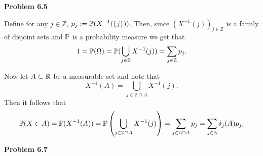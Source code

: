 \bigskip

\textbf{Problem 6.5}

Define for any $j \in \mathbb{Z}$, $p_j := \mathbb P(X^{-1}(\{j\}))$. Then, since $(X^{-1}(j))_{j \in \mathbb{Z}}$ is a family of disjoint sets and $\mathbb P$ is a probability measure we get that
\[
	1 = \mathbb P(\Omega) = \mathbb P(\bigcup_{j \in \mathbb{Z}} X^{-1}(j)) = \sum_{j \in \mathbb{Z}} p_j.
\]

Now let $A \subset \mathbb R$ be a measurable set and note that 
\[
	X^{-1}(A) = \bigcup_{j \in \mathbb{Z} \cap A} X^{-1}(j).
\]
Then it follows that
\[
	\mathbb P(X \in A) = \mathbb P(X^{-1}(A)) = \mathbb P\left(\bigcup_{j \in \mathbb{Z} \cap A} X^{-1}(j)\right)
	= \sum_{j \in \mathbb{Z} \cap A} p_j = \sum_{j \in \mathbb{Z}} \delta_j(A) p_j. 
\]

\bigskip

\textbf{Problem 6.7}

